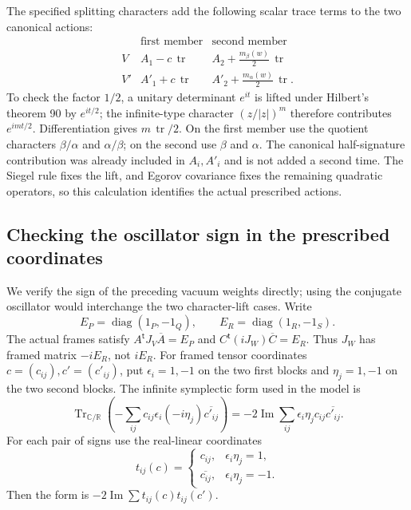 The specified splitting characters add the following scalar
trace terms to the two canonical actions:
\begin{equation}\label{eq:sr-real-source-fock-shifts}
 \begin{array}{c|cc}
    &\text{first member}&\text{second member}\\ \hline
 V   & A_1-c\,\operatorname{tr}
        & A_2+\frac{m_\beta(w)}2\,\operatorname{tr}\\[2pt]
 V'  & A'_1+c\,\operatorname{tr}
        & A'_2+\frac{m_\alpha(w)}2\,\operatorname{tr}.
 \end{array}
\end{equation}
To check the factor \(1/2\), a unitary determinant \(e^{it}\)
is lifted under Hilbert's theorem 90 by \(e^{it/2}\);
the infinite-type character \((z/|z|)^m\) therefore contributes
\(e^{imt/2}\). Differentiation gives \(m\,\operatorname{tr}/2\).
On the first member use the quotient characters
\(\beta/\alpha\) and \(\alpha/\beta\); on the second use
\(\beta\) and \(\alpha\). The canonical half-signature
contribution was already included in \(A_i,A'_i\) and is
not added a second time.
The Siegel rule fixes the lift, and Egorov covariance fixes
the remaining quadratic operators, so this calculation
identifies the actual prescribed actions.

\subsection{Checking the oscillator sign in the prescribed coordinates}
\label{subsec:sr-real-oscillator-sign}

We verify the sign of the preceding vacuum weights directly;
using the conjugate oscillator would interchange the two
character-lift cases. Write
\[
 E_P=\operatorname{diag}(1_P,-1_Q),\qquad
 E_R=\operatorname{diag}(1_R,-1_S).
\]
The actual frames satisfy \(A^{\mathsf t}J_V\overline A=E_P\)
and \(C^{\mathsf t}(iJ_W)\overline C=E_R\).
Thus \(J_W\) has framed matrix \(-iE_R\), not \(iE_R\).
For framed tensor coordinates \(c=(c_{ij}),c'=(c'_{ij})\),
put \(\epsilon_i=1,-1\) on the two first blocks and
\(\eta_j=1,-1\) on the two second blocks.
The infinite symplectic form used in the model is
\[
 \operatorname{Tr}_{\mathbb C/\mathbb R}
      \left(-\sum_{ij}c_{ij}\epsilon_i(-i\eta_j)
                                      \overline{c'_{ij}}\right)
        =-2\operatorname{Im}
               \sum_{ij}\epsilon_i\eta_jc_{ij}\overline{c'_{ij}} .
\]
For each pair of signs use the real-linear coordinates
\[
 t_{ij}(c)=
   \begin{cases}
       c_{ij},&\epsilon_i\eta_j=1,\\
       \overline{c_{ij}},&\epsilon_i\eta_j=-1.
   \end{cases}
\]
Then the form is
\(-2\operatorname{Im}\sum t_{ij}(c)\overline{t_{ij}(c')}\).

